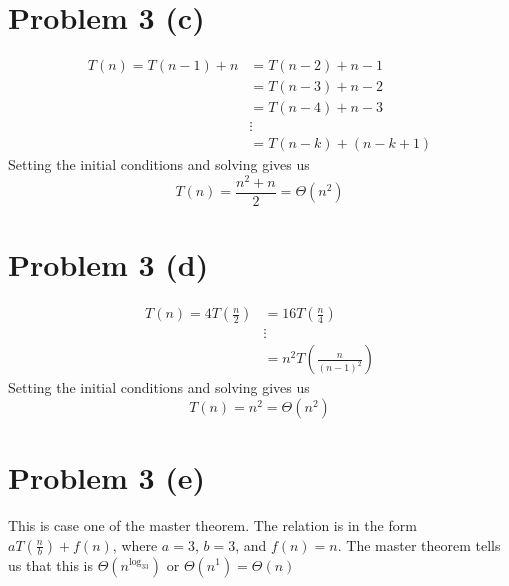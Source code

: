 \documentclass{article}
\newenvironment{problem}[1]{
  \nobreak\section*{Problem #1}
}{}
\newcommand*{\bigTheta}[1]{\ensuremath{\Theta\left(#1\right)}}
\begin{document}
  \begin{problem}{3 (c)}
    \begin{equation*}
      \begin{split}
        T(n) = T(n - 1) + n & = T(n - 2) + n - 1 \\
        & = T(n - 3) + n - 2 \\
        & = T(n - 4) + n - 3 \\
        & \vdots \\
        & = T(n - k) + (n - k + 1)
      \end{split}
    \end{equation*}
    Setting the initial conditions and solving gives us
    \begin{displaymath}
      T(n) = \frac{n^2 + n}{2} = \bigTheta{n^2}
    \end{displaymath}
  \end{problem}

  \begin{problem}{3 (d)}
    \begin{equation*}
      \begin{split}
        T(n) = 4T(\frac{n}{2}) & = 16T(\frac{n}{4}) \\
        & \vdots \\
        & = n^2T(\frac{n}{(n - 1)^2})
      \end{split}
    \end{equation*}
    Setting the initial conditions and solving gives us
    \begin{displaymath}
      T(n) = n^2 = \bigTheta{n^2}
    \end{displaymath}
  \end{problem}

  \begin{problem}{3 (e)}
    This is case one of the master theorem.  The relation is in
    the form $aT(\frac{n}{b}) + f(n)$, where $a = 3$, $b = 3$, and
    $f(n) = n$.  The master theorem tells us that this is $\bigTheta{n^{\log_33}}$
    or $\bigTheta{n^1} = \bigTheta{n}$
  \end{problem}
\end{document}
